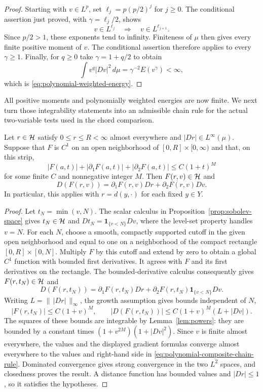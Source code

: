 \begin{proof}
Starting with $v\in L^p$, set $\ell_j=p(p/2)^j$ for $j\ge0$.
The conditional assertion just proved, with $\gamma=\ell_j/2$, shows
\[
 v\in L^{\ell_j}\quad\Longrightarrow\quad v\in L^{\ell_{j+1}}.
\]
Since $p/2>1$, these exponents tend to infinity.  Finiteness of $\mu$ then gives
every finite positive moment of $v$.  The conditional assertion
therefore applies to every $\gamma\ge1$.  Finally, for $q\ge0$
take $\gamma=1+q/2$ to obtain
\[
 \int v^q|Dv|^2\,d\mu=\gamma^{-2}E(v^\gamma)<\infty,
\]
which is \eqref{eq:polynomial-weighted-energy}.
\end{proof}

All positive moments and polynomially weighted energies are now
finite. We next turn those integrability statements into an admissible
chain rule for the actual two-variable tests used in the chord
comparison.

\begin{lemma}
\label{lem:composites}
Let $r\in\mathcal H$ satisfy $0\le r\le R<\infty$ almost everywhere and
$|Dr|\in L^\infty(\mu)$.  Suppose that $F$ is $C^1$ on an open
neighborhood of $[0,R]\times[0,\infty)$ and that, on this strip,
\[
 |F(a,t)|+|\partial_1F(a,t)|+|\partial_2F(a,t)|
 \le C(1+t)^M
\]
for some finite $C$ and nonnegative integer $M$.  Then
$F(r,v)\in\mathcal H$ and
\begin{equation}
 D(F(r,v))=\partial_1F(r,v)Dr+\partial_2F(r,v)Dv.
 \label{eq:polynomial-composite-chain-rule}
\end{equation}
In particular, this applies with $r=d(y,\cdot)$ for each fixed
$y\in Y$.
\end{lemma}

\begin{proof}
Let $t_N=\min(v,N)$.  The scalar calculus in
Proposition~\ref{prop:sobolev-space} gives $t_N\in\mathcal H$ and
$Dt_N=\mathbf1_{\{v<N\}}Dv$, where the level-set property handles
$v=N$.  For each $N$, choose a smooth, compactly supported cutoff in the given
open neighborhood and equal to one on a neighborhood of the compact
rectangle $[0,R]\times[0,N]$.  Multiply $F$ by this cutoff and extend
by zero to obtain a global $C^1$ function with bounded first
derivatives.  It agrees with $F$ and its first derivatives on the
rectangle.  The bounded-derivative calculus consequently gives
$F(r,t_N)\in\mathcal H$ and
\[
 D(F(r,t_N))
 =\partial_1F(r,t_N)Dr
  +\partial_2F(r,t_N)\mathbf1_{\{v<N\}}Dv.
\]
Writing $L=\|\,|Dr|\,\|_\infty$, the growth assumption gives bounds
independent of $N$,
\[
 |F(r,t_N)|\le C(1+v)^M,\qquad
 |D(F(r,t_N))|\le C(1+v)^M(L+|Dv|).
\]
The squares of these bounds are integrable by
Lemma~\ref{lem:powers}: they are bounded by a constant times
$(1+v^{2M})(1+|Dv|^2)$.  Since $v$ is finite almost everywhere,
the values and the displayed gradient formulas converge almost
everywhere to the values and right-hand side in
\eqref{eq:polynomial-composite-chain-rule}.  Dominated convergence
gives strong convergence in the two $L^2$ spaces, and closedness
proves the result.  A distance function has bounded values and
$|Dr|\le1$, so it satisfies the hypotheses.
\end{proof}
